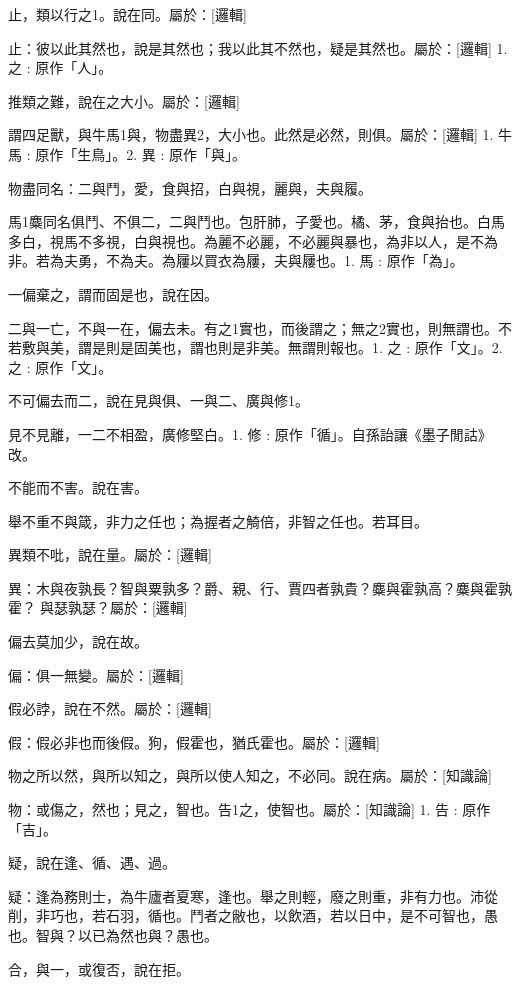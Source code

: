 
\begin{pinyinscope}
止，類以行之1。說在同。屬於：[邏輯]

止：彼以此其然也，說是其然也；我以此其不然也，疑是其然也。屬於：[邏輯] 
1. 之 : 原作「人」。

推類之難，說在之大小。屬於：[邏輯]

謂四足獸，與牛馬1與，物盡異2，大小也。此然是必然，則俱。屬於：[邏輯] 
1. 牛馬 : 原作「生鳥」。2. 異 : 原作「與」。

物盡同名：二與鬥，愛，食與招，白與視，麗與，夫與履。

馬1麋同名俱鬥、不俱二，二與鬥也。包肝肺，子愛也。橘、茅，食與抬也。白馬多白，視馬不多視，白與視也。為麗不必麗，不必麗與暴也，為非以人，是不為非。若為夫勇，不為夫。為屨以買衣為屨，夫與屨也。1. 馬 : 原作「為」。

一偏棄之，謂而固是也，說在因。

二與一亡，不與一在，偏去未。有之1實也，而後謂之；無之2實也，則無謂也。不若敷與美，謂是則是固美也，謂也則是非美。無謂則報也。1. 之 : 原作「文」。2. 之 : 原作「文」。

不可偏去而二，說在見與俱、一與二、廣與修1。

見不見離，一二不相盈，廣修堅白。1. 修 : 原作「循」。自孫詒讓《墨子閒詁》改。

不能而不害。說在害。

舉不重不與箴，非力之任也；為握者之觭倍，非智之任也。若耳目。

異類不吡，說在量。屬於：[邏輯]

異：木與夜孰長？智與粟孰多？爵、親、行、賈四者孰貴？麋與霍孰高？麋與霍孰霍？𧈳與瑟孰瑟？屬於：[邏輯]

偏去莫加少，說在故。

偏：俱一無變。屬於：[邏輯]

假必誖，說在不然。屬於：[邏輯]

假：假必非也而後假。狗，假霍也，猶氏霍也。屬於：[邏輯]

物之所以然，與所以知之，與所以使人知之，不必同。說在病。屬於：[知識論]

物：或傷之，然也；見之，智也。告1之，使智也。屬於：[知識論] 
1. 告 : 原作「吉」。

疑，說在逢、循、遇、過。

疑：逢為務則士，為牛廬者夏寒，逢也。舉之則輕，廢之則重，非有力也。沛從削，非巧也，若石羽，循也。鬥者之敝也，以飲酒，若以日中，是不可智也，愚也。智與？以已為然也與？愚也。

合，與一，或復否，說在拒。




\end{pinyinscope}
